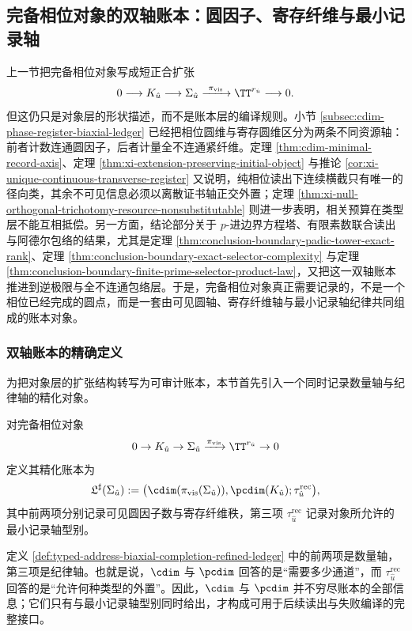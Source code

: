 \subsection{完备相位对象的双轴账本：圆因子、寄存纤维与最小记录轴}\label{subsec:typed-address-biaxial-completion-biaxial-ledger}
上一节把完备相位对象写成短正合扩张
\[
0\longrightarrow K_{\hat u}\longrightarrow \Sigma_{\hat u}
\xrightarrow{\ \pi_{\mathrm{vis}}\ } \TT^{r_{\hat u}}
\longrightarrow 0.
\]
但这仍只是对象层的形状描述，而不是账本层的编译规则。小节 \ref{subsec:cdim-phase-register-biaxial-ledger} 已经把相位圆维与寄存圆维区分为两条不同资源轴：前者计数连通圆因子，后者计量全不连通紧纤维。定理 \ref{thm:cdim-minimal-record-axis}、定理 \ref{thm:xi-extension-preserving-initial-object} 与推论 \ref{cor:xi-unique-continuous-transverse-register} 又说明，纯相位读出下连续横截只有唯一的径向类，其余不可见信息必须以离散证书轴正交外置；定理 \ref{thm:xi-null-orthogonal-trichotomy-resource-nonsubstitutable} 则进一步表明，相关预算在类型层不能互相抵偿。另一方面，结论部分关于 \(p\)-进边界方程塔、有限素数联合读出与阿德尔包络的结果，尤其是定理 \ref{thm:conclusion-boundary-padic-tower-exact-rank}、定理 \ref{thm:conclusion-boundary-exact-selector-complexity} 与定理 \ref{thm:conclusion-boundary-finite-prime-selector-product-law}，又把这一双轴账本推进到逆极限与全不连通包络层。于是，完备相位对象真正需要记录的，不是一个相位已经完成的圆点，而是一套由可见圆轴、寄存纤维轴与最小记录轴纪律共同组成的账本对象。

\subsubsection{双轴账本的精确定义}\label{subsubsec:typed-address-biaxial-completion-ledger-definition}
为把对象层的扩张结构转写为可审计账本，本节首先引入一个同时记录数量轴与纪律轴的精化对象。

\begin{definition}[完备相位对象的精化账本]\label{def:typed-address-biaxial-completion-refined-ledger}
对完备相位对象
\[
0\to K_{\hat u}\to \Sigma_{\hat u}\xrightarrow{\pi_{\mathrm{vis}}}\TT^{r_{\hat u}}\to 0
\]
定义其精化账本为
\[
\mathfrak L^\sharp(\Sigma_{\hat u})
:=
\bigl(
\cdim(\pi_{\mathrm{vis}}(\Sigma_{\hat u})),
\pcdim(K_{\hat u});
\tau^{\mathrm{rec}}_{\hat u}
\bigr),
\]
其中前两项分别记录可见圆因子数与寄存纤维秩，第三项 \(\tau^{\mathrm{rec}}_{\hat u}\) 记录对象所允许的最小记录轴型别。
\end{definition}

定义 \ref{def:typed-address-biaxial-completion-refined-ledger} 中的前两项是数量轴，第三项是纪律轴。也就是说，\(\cdim\) 与 \(\pcdim\) 回答的是“需要多少通道”，而 \(\tau^{\mathrm{rec}}_{\hat u}\) 回答的是“允许何种类型的外置”。因此，\(\cdim\) 与 \(\pcdim\) 并不穷尽账本的全部信息；它们只有与最小记录轴型别同时给出，才构成可用于后续读出与失败编译的完整接口。

